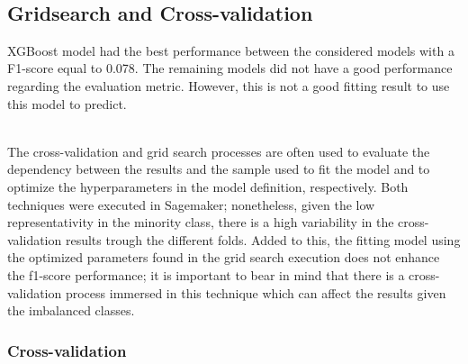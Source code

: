 \documentclass[11pt]{article}
\begin{document}
    \begin{center}
    \end{center}
    { \hspace*{\fill} \\}
    
    \hypertarget{gridsearch-and-cross-validation}{%
\subsection{Gridsearch and
Cross-validation}\label{gridsearch-and-cross-validation}}

    XGBoost model had the best performance between the considered models
with a F1-score equal to 0.078. The remaining models did not have a good
performance regarding the evaluation metric. However, this is not a good
fitting result to use this model to predict.

~\\

The cross-validation and grid search processes are often used to
evaluate the dependency between the results and the sample used to fit
the model and to optimize the hyperparameters in the model definition,
respectively. Both techniques were executed in Sagemaker; nonetheless,
given the low representativity in the minority class, there is a high
variability in the cross-validation results trough the different folds.
Added to this, the fitting model using the optimized parameters found in
the grid search execution does not enhance the f1-score performance; it
is important to bear in mind that there is a cross-validation process
immersed in this technique which can affect the results given the
imbalanced classes.

    \hypertarget{cross-validation}{%
\subsubsection{Cross-validation}\label{cross-validation}}
\end{document}
